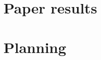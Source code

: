 \documentclass[a4paper,11pt]{article}
\begin{document}
\section{Paper results}


\section{Planning}
\end{document}

